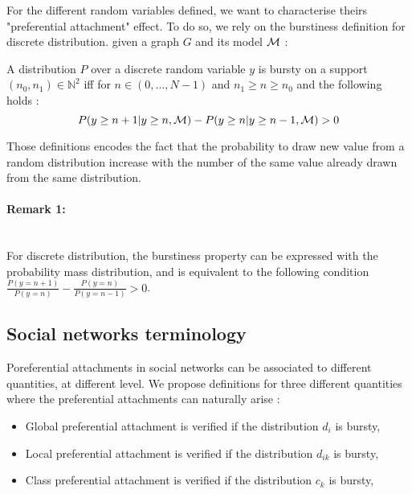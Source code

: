 For the different random variables defined, we want to characterise theirs "preferential attachment" effect. To do so, we rely on the burstiness definition for discrete distribution. given a graph $G$ and its model $\mathcal{M}$  :

\begin{definition} \label{discrete_burstiness}
    A distribution $P$ over a discrete random variable $y$ is bursty on a support $(n_0, n_1) \in \mathbb{N}^2$ iff for $n \in (0,..., N-1)$ and $n_1 \geq  n \geq n_0$ and the following holds : 
    \begin{equation}
        P(y \geq n+1 | y \geq n, \mathcal{M}) - P(y \geq n | y \geq n-1, \mathcal{M}) > 0
    \end{equation}
\end{definition}

Those definitions encodes the fact that the probability to draw new value from a random distribution increase with the number of the same value already drawn from the same distribution.


\paragraph{Remark 1:}~\\ \label{eq:burst_mass}
For discrete distribution, the burstiness property can be expressed with the probability mass distribution, and is equivalent to the following condition $\frac{P(y = n+1)}{P(y=n)} - \frac{P(y = n)}{P(y=n-1)} > 0$.

\subsection{Social networks terminology}

Poreferential attachments in social networks can be associated to different quantities, at different level. We propose definitions for three different quantities where the preferential attachments can naturally arise \cite{LeskovecBKT08}:
\begin{itemize}
    \item Global preferential attachment is verified if the distribution $d_i$ is bursty,
    \item Local preferential attachment is verified if the distribution $d_{ik}$ is bursty,
    \item Class preferential attachment is verified if the distribution $c_k$ is bursty,
\end{itemize}

